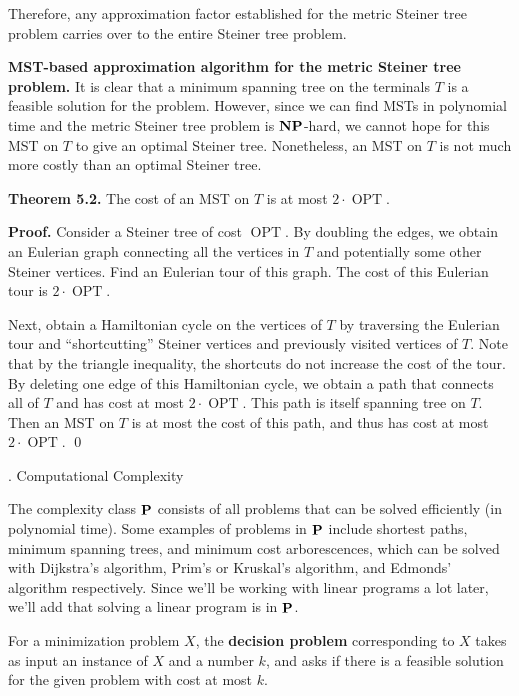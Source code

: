 \documentclass{article}
\DeclareMathOperator{\Poly}{{\bf P}}
\DeclareMathOperator{\NP}{{\bf NP}}
\DeclareMathOperator{\OPT}{\text{OPT}}
\begin{document}
Therefore, any approximation factor established for the metric Steiner tree 
problem carries over to the entire Steiner tree problem. 

{\color{violet} 
{\bf MST-based approximation algorithm for the metric Steiner tree problem.} 
It is clear that a minimum spanning tree on the terminals $T$ is a 
feasible solution for the problem. However, since we can find MSTs 
in polynomial time and the metric Steiner tree problem is $\NP$-hard, 
we cannot hope for this MST on $T$ to give an optimal Steiner tree. Nonetheless, 
an MST on $T$ is not much more costly than an optimal Steiner tree.

{\bf Theorem 5.2.} The cost of an MST on $T$ is at most $2 \cdot \OPT$.
}

{\color{blue}
{\bf Proof.} Consider a Steiner tree of cost $\OPT$. By doubling the edges, 
we obtain an Eulerian graph connecting all the vertices in $T$ and 
potentially some other Steiner vertices. Find an Eulerian tour of this graph. 
The cost of this Eulerian tour is $2 \cdot \OPT$. 

Next, obtain a Hamiltonian cycle on the vertices of $T$ by traversing 
the Eulerian tour and ``shortcutting'' Steiner vertices and previously 
visited vertices of $T$. Note that by the triangle inequality, the 
shortcuts do not increase the cost of the tour. By deleting one edge 
of this Hamiltonian cycle, we obtain a path that connects all of $T$ 
and has cost at most $2 \cdot \OPT$. This path is itself
spanning tree on $T$. Then an MST on $T$ is at most the cost of this path, 
and thus has cost at most $2 \cdot \OPT$. \qed 
}

\newpage 
\begin{center}
    {. Computational Complexity}
\end{center}

The complexity class $\Poly$ consists of all problems that can be 
solved efficiently (in polynomial time). Some examples of 
problems in $\Poly$ include shortest paths, minimum spanning trees, and 
minimum cost arborescences, which can be solved with Dijkstra's algorithm, 
Prim's or Kruskal's algorithm, and Edmonds' algorithm respectively. 
Since we'll be working with linear programs a lot later, 
we'll add that solving a linear program is in $\Poly$. 

For a minimization problem $X$, the {\bf decision problem} corresponding to 
$X$ takes as input an instance of $X$ and a number $k$, and asks 
if there is a feasible solution for the given problem with cost at most $k$.
\end{document}
